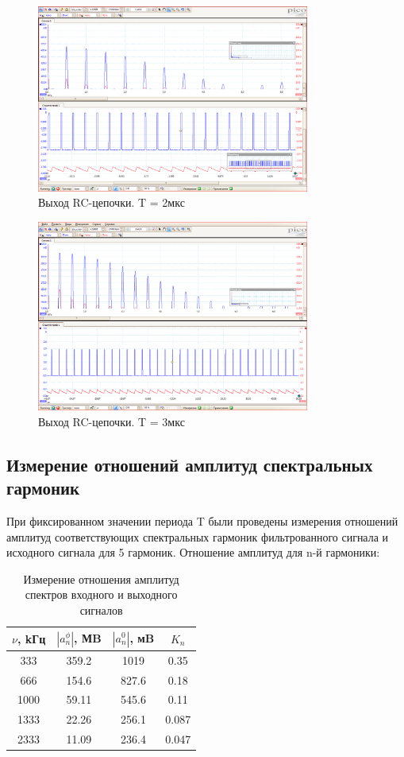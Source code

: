 \documentclass[a4paper]{article}
\begin{document}
\begin{figure}[h!]
\centering
\includegraphics[width=0.8\textwidth]{Интегратор tau=200нс T=2мкс.PNG}
\caption{Выход RC-цепочки. T = 2мкс}
\end{figure}

\begin{figure}[h!]
\centering
\includegraphics[width=0.8\textwidth]{Интегратор tau=200нс T=3мкс.PNG}
\caption{Выход RC-цепочки. T = 3мкс}
\end{figure}

\clearpage
\newpage

\subsection{Измерение отношений амплитуд спектральных гармоник}

При фиксированном значении периода T были проведены измерения 
отношений амплитуд соответствующих спектральных гармоник фильтрованного сигнала и исходного сигнала для 5 гармоник.
Отношение амплитуд для n-й гармоники:

\begin{table}[h!]
\centering
\begin{tabular}{|c|c|c|c|}
\hline
$\nu$, kГц & $|a_n^{\phi}|$, МB & $|a_n^0|$, мB & $K_n$ \\
\hline
333  & 359.2  & 1019  & 0.35 \\
666  & 154.6  & 827.6 & 0.18 \\
1000 & 59.11  & 545.6 & 0.11 \\
1333 & 22.26  & 256.1 & 0.087 \\
2333 & 11.09  & 236.4 & 0.047 \\
\hline
\end{tabular}
\caption{Измерение отношения амплитуд спектров входного и выходного сигналов}
\end{table}
\end{document}
